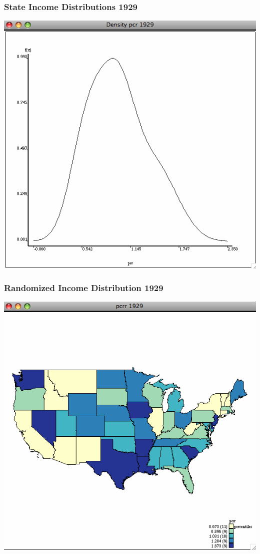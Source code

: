 \documentclass[nototal]{beamer}
\begin{document}
\begin{frame}
	\frametitle{State Income Distributions 1929}
 \begin{center}
 \includegraphics[width=.65\linewidth]{density29.png}
  \end{center}
 \end{frame} 

\begin{frame}
	\frametitle{Randomized Income Distribution 1929}
 \begin{center}
 \includegraphics[width=.65\linewidth]{income29random.png}
  \end{center}
 \end{frame} 
\end{document}
